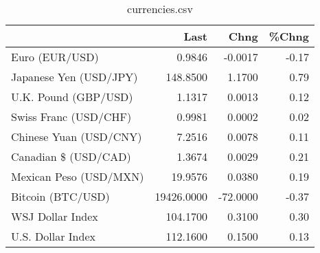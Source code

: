 \documentclass{article}%
\begin{document}
%


\begin{table}[htbp]%
\caption{currencies.csv}%
\centering%
\begin{adjustbox}{width=1\textwidth}%
\begin{tabular}{lrrr}
\toprule
                       &       Last &     Chng &  \%Chng \\
\midrule
        Euro (EUR/USD) &     0.9846 &  -0.0017 &  -0.17 \\
Japanese Yen (USD/JPY) &   148.8500 &   1.1700 &   0.79 \\
  U.K. Pound (GBP/USD) &     1.1317 &   0.0013 &   0.12 \\
 Swiss Franc (USD/CHF) &     0.9981 &   0.0002 &   0.02 \\
Chinese Yuan (USD/CNY) &     7.2516 &   0.0078 &   0.11 \\
  Canadian \$ (USD/CAD) &     1.3674 &   0.0029 &   0.21 \\
Mexican Peso (USD/MXN) &    19.9576 &   0.0380 &   0.19 \\
     Bitcoin (BTC/USD) & 19426.0000 & -72.0000 &  -0.37 \\
      WSJ Dollar Index &   104.1700 &   0.3100 &   0.30 \\
     U.S. Dollar Index &   112.1600 &   0.1500 &   0.13 \\
\bottomrule
\end{tabular}
%
\end{adjustbox}%
\end{table}

%
\end{document}
